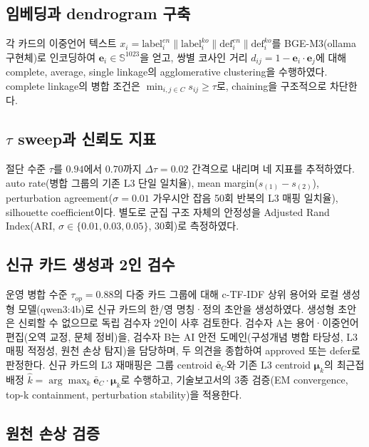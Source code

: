 \documentclass[11pt,a4paper]{article}
\begin{document}
\subsection{임베딩과 dendrogram 구축}

각 카드의 이중언어 텍스트 $x_i = \mathrm{label}^{en}_i \| \mathrm{label}^{ko}_i \| \mathrm{def}^{en}_i \| \mathrm{def}^{ko}_i$를 BGE-M3(ollama 구현체)로 인코딩하여 $\mathbf{e}_i \in \mathbb{S}^{1023}$을 얻고, 쌍별 코사인 거리 $d_{ij}=1-\mathbf{e}_i\cdot\mathbf{e}_j$에 대해 complete, average, single linkage의 agglomerative clustering을 수행하였다. complete linkage의 병합 조건은 $\min_{i,j\in C} s_{ij} \geq \tau$로, chaining을 구조적으로 차단한다.

\subsection{$\tau$ sweep과 신뢰도 지표}

절단 수준 $\tau$를 $0.94$에서 $0.70$까지 $\Delta\tau=0.02$ 간격으로 내리며 네 지표를 추적하였다. auto rate(병합 그룹의 기존 L3 단일 일치율), mean margin($s_{(1)}-s_{(2)}$), perturbation agreement($\sigma=0.01$ 가우시안 잡음 50회 반복의 L3 매핑 일치율), silhouette coefficient이다. 별도로 군집 구조 자체의 안정성을 Adjusted Rand Index(ARI, $\sigma\in\{0.01,0.03,0.05\}$, 30회)로 측정하였다.

\subsection{신규 카드 생성과 2인 검수}

운영 병합 수준 $\tau_{op}=0.88$의 다중 카드 그룹에 대해 c-TF-IDF 상위 용어와 로컬 생성형 모델(qwen3:4b)로 신규 카드의 한/영 명칭·정의 초안을 생성하였다. 생성형 초안은 신뢰할 수 없으므로 독립 검수자 2인이 사후 검토한다. 검수자 A는 용어·이중언어 편집(오역 교정, 문체 정비)을, 검수자 B는 AI 안전 도메인(구성개념 병합 타당성, L3 매핑 적정성, 원천 손상 탐지)을 담당하며, 두 의견을 종합하여 approved 또는 defer로 판정한다. 신규 카드의 L3 재매핑은 그룹 centroid $\bar{\mathbf{e}}_C$와 기존 L3 centroid $\boldsymbol{\mu}_k$의 최근접 배정 $\hat{k}=\arg\max_k \bar{\mathbf{e}}_C\cdot\boldsymbol{\mu}_k$로 수행하고, 기술보고서의 3종 검증(EM convergence, top-k containment, perturbation stability)을 적용한다.

\subsection{원천 손상 검증}
\end{document}
